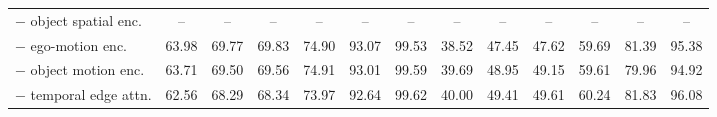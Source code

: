 \begin{table}[t]
{\begin{tabular}{l cccccc cccccc}
$-$ object spatial enc. & -- & -- & -- & -- & -- & -- & -- & -- & -- & -- & -- & -- \\
$-$ ego-motion enc. & 63.98 & 69.77 & 69.83 & 74.90 & 93.07 & 99.53 & 38.52 & 47.45 & 47.62 & 59.69 & 81.39 & 95.38 \\
$-$ object motion enc. & 63.71 & 69.50 & 69.56 & 74.91 & 93.01 & 99.59 & 39.69 & 48.95 & 49.15 & 59.61 & 79.96 & 94.92 \\
$-$ temporal edge attn. & 62.56 & 68.29 & 68.34 & 73.97 & 92.64 & 99.62 & 40.00 & 49.41 & 49.61 & 60.24 & 81.83 & 96.08 \\
\bottomrule
\end{tabular}}
\end{table}
